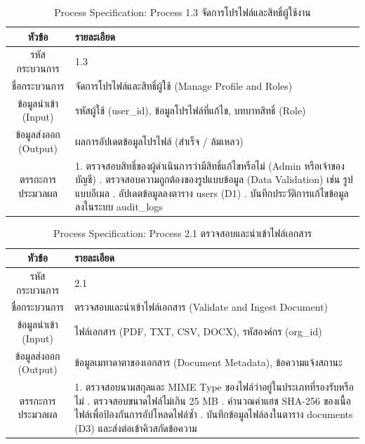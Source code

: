 \begin{table}[htbp]
\centering
\caption{Process Specification: Process 1.3 จัดการโปรไฟล์และสิทธิ์ผู้ใช้งาน}
\label{tab3:pspec1_3}
\begin{tabularx}{\textwidth}{| c | L |}
\hline
\textbf{หัวข้อ} & \textbf{รายละเอียด} \\ \hline
รหัสกระบวนการ & 1.3 \\ \hline
ชื่อกระบวนการ & จัดการโปรไฟล์และสิทธิ์ผู้ใช้ (Manage Profile and Roles) \\ \hline
ข้อมูลนำเข้า (Input) & รหัสผู้ใช้ (user\_id), ข้อมูลโปรไฟล์ที่แก้ไข, บทบาทสิทธิ์ (Role) \\ \hline
ข้อมูลส่งออก (Output) & ผลการอัปเดตข้อมูลโปรไฟล์ (สำเร็จ / ล้มเหลว) \\ \hline
ตรรกะการประมวลผล & 1. ตรวจสอบสิทธิ์ของผู้ดำเนินการว่ามีสิทธิ์แก้ไขหรือไม่ (Admin หรือเจ้าของบัญชี) . ตรวจสอบความถูกต้องของรูปแบบข้อมูล (Data Validation) เช่น รูปแบบอีเมล . อัปเดตข้อมูลลงตาราง users (D1) . บันทึกประวัติการแก้ไขข้อมูลลงในระบบ audit\_logs \\ \hline
\end{tabularx}
\end{table}

\begin{table}[htbp]
\centering
\caption{Process Specification: Process 2.1 ตรวจสอบและนำเข้าไฟล์เอกสาร}
\label{tab3:pspec2_1}
\begin{tabularx}{\textwidth}{| c | L |}
\hline
\textbf{หัวข้อ} & \textbf{รายละเอียด} \\ \hline
รหัสกระบวนการ & 2.1 \\ \hline
ชื่อกระบวนการ & ตรวจสอบและนำเข้าไฟล์เอกสาร (Validate and Ingest Document) \\ \hline
ข้อมูลนำเข้า (Input) & ไฟล์เอกสาร (PDF, TXT, CSV, DOCX), รหัสองค์กร (org\_id) \\ \hline
ข้อมูลส่งออก (Output) & ข้อมูลเมทาดาตาของเอกสาร (Document Metadata), ข้อความแจ้งสถานะ \\ \hline
ตรรกะการประมวลผล & 1. ตรวจสอบนามสกุลและ MIME Type ของไฟล์ว่าอยู่ในประเภทที่รองรับหรือไม่ . ตรวจสอบขนาดไฟล์ไม่เกิน 25 MB . คำนวณค่าแฮช SHA-256 ของเนื้อไฟล์เพื่อป้องกันการอัปโหลดไฟล์ซ้ำ . บันทึกข้อมูลไฟล์ลงในตาราง documents (D3) และส่งต่อเข้าคิวสกัดข้อความ \\ \hline
\end{tabularx}
\end{table}

